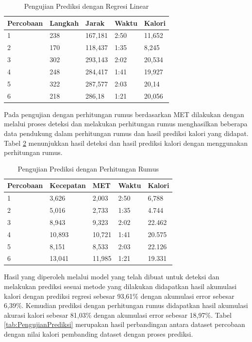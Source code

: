 \begin{table} [ht]
  \caption{Pengujian Prediksi dengan Regresi Linear}
  \label{tab:PengujianPrediksiRegresi}
  \centering
  \begin{tabular}{lllll}
    \toprule
    Percobaan & Langkah & Jarak  &  Waktu & Kalori \\
    \midrule
    1   & 238   & 167,181    & 2:50    & 11,652  \\
    2   & 170   & 118,437    & 1:35    & 8,245   \\
    3   & 302   & 293,143    & 2:02    & 20,534  \\
    4   & 248   & 284,417    & 1:41    & 19,927  \\
    5   & 322   & 287,577    & 2:03    & 20,14   \\
    6   & 218   & 286,18     & 1:21    & 20,056  \\
    \bottomrule
  \end{tabular}
\end{table}

Pada pengujian dengan perhitungan rumus berdasarkan MET dilakukan dengan melalui proses deteksi dan melakukan perhitungan rumus menghasilkan beberapa data pendukung dalam perhitungan rumus dan hasil prediksi kalori yang didapat. Tabel \ref{tab:PengujianPrediksiPerhitungan} menunjukkan hasil deteksi dan hasil prediksi kalori dengan menggunakan perhitungan rumus.

\begin{table} [ht]
  \caption{Pengujian Prediksi dengan Perhitungan Rumus}
  \label{tab:PengujianPrediksiPerhitungan}
  \centering
  \begin{tabular}{lllll}
    \toprule
    Percobaan & Kecepatan & MET  &  Waktu & Kalori \\
    \midrule
    1   & 3,626   & 2,003    & 2:50    & 6,788   \\
    2   & 5,016   & 2,733    & 1:35    & 4.744   \\
    3   & 8,943   & 9,323    & 2:02    & 22.462  \\
    4   & 10,893  & 10,721   & 1:41    & 20.575  \\
    5   & 8,151   & 8,533    & 2:03    & 22.126  \\
    6   & 13,041  & 11,985   & 1:21    & 19.331  \\
    \bottomrule
  \end{tabular}
\end{table}

Hasil yang diperoleh melalui model yang telah dibuat untuk deteksi dan melakukan prediksi sesuai metode yang dilakukan didapatkan hasil akumulasi kalori dengan prediksi regresi sebesar 93,61\% dengan akumulasi error sebesar 6,39\%. Kemudian prediksi dengan perhitungan rumus didapatkan hasil akumulasi akurasi kalori sebesar 81,03\% dengan akumulasi error sebesar 18,97\%. Tabel \ref{tab:PengujianPrediksi} merupakan hasil perbandingan antara dataset percobaan dengan nilai kalori pembanding dataset dengan proses prediksi.


